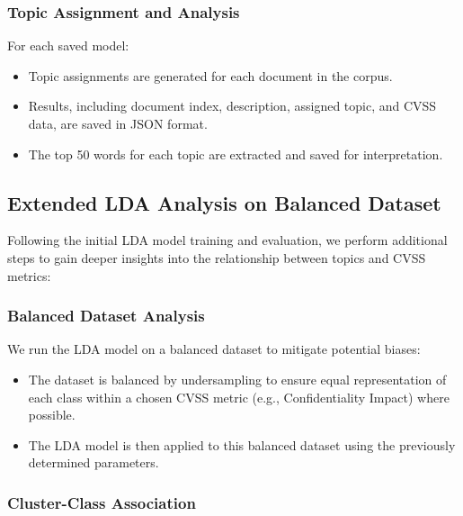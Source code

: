 \documentclass[12pt]{article}
\begin{document}
\subsubsection{Topic Assignment and Analysis}

For each saved model:

\begin{itemize}

	\item Topic assignments are generated for each document in the corpus.

	\item Results, including document index, description, assigned topic, and CVSS data, are saved
	      in JSON format.

	\item The top 50 words for each topic are extracted and saved for interpretation.

\end{itemize}

\subsection{Extended LDA Analysis on Balanced Dataset}

Following the initial LDA model training and evaluation, we perform additional steps to gain deeper insights into the relationship between topics and CVSS metrics:

\subsubsection{Balanced Dataset Analysis}

We run the LDA model on a balanced dataset to mitigate potential biases:

\begin{itemize}

	\item The dataset is balanced by undersampling to ensure equal representation of each class
	      within a chosen CVSS metric (e.g., Confidentiality Impact) where possible.

	\item The LDA model is then applied to this balanced dataset using the previously determined parameters.

\end{itemize}

\subsubsection{Cluster-Class Association}
\end{document}
